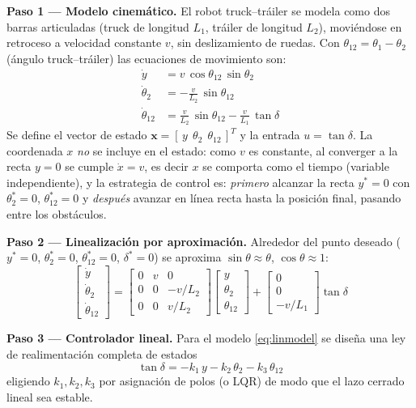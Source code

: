 \documentclass[11pt,a4paper]{article}
\begin{document}
\textbf{Paso 1 — Modelo cinemático.} El robot truck--tráiler se modela como dos barras articuladas (truck de longitud $L_1$, tráiler de longitud $L_2$), moviéndose en retroceso a velocidad constante $v$, sin deslizamiento de ruedas. Con $\theta_{12}=\theta_1-\theta_2$ (ángulo truck--tráiler) las ecuaciones de movimiento son:
\begin{align}
\dot{y} &= v\,\cos\theta_{12}\,\sin\theta_2 \\
\dot{\theta}_2 &= -\frac{v}{L_2}\,\sin\theta_{12} \\
\dot{\theta}_{12} &= \frac{v}{L_2}\,\sin\theta_{12} - \frac{v}{L_1}\,\tan\delta
\end{align}
Se define el vector de estado $\mathbf{x}=[\,y\ \ \theta_2\ \ \theta_{12}\,]^{T}$ y la entrada $u=\tan\delta$. La coordenada $x$ \emph{no} se incluye en el estado: como $v$ es constante, al converger a la recta $y=0$ se cumple $\dot x = v$, es decir $x$ se comporta como el tiempo (variable independiente), y la estrategia de control es: \emph{primero} alcanzar la recta $y^{*}=0$ con $\theta_2^{*}=0$, $\theta_{12}^{*}=0$ y \emph{después} avanzar en línea recta hasta la posición final, pasando entre los obstáculos.

\textbf{Paso 2 — Linealización por aproximación.} Alrededor del punto deseado ($y^{*}=0$, $\theta_2^{*}=0$, $\theta_{12}^{*}=0$, $\delta^{*}=0$) se aproxima $\sin\theta\approx\theta$, $\cos\theta\approx 1$:
\begin{equation}
\begin{bmatrix}\dot y\\ \dot\theta_2\\ \dot\theta_{12}\end{bmatrix}
=
\begin{bmatrix}0 & v & 0\\ 0 & 0 & -v/L_2\\ 0 & 0 & v/L_2\end{bmatrix}
\begin{bmatrix}y\\ \theta_2\\ \theta_{12}\end{bmatrix}
+
\begin{bmatrix}0\\ 0\\ -v/L_1\end{bmatrix}\tan\delta
\label{eq:linmodel}
\end{equation}

\textbf{Paso 3 — Controlador lineal.} Para el modelo \eqref{eq:linmodel} se diseña una ley de realimentación completa de estados
\begin{equation}
\tan\delta = -k_1\,y - k_2\,\theta_2 - k_3\,\theta_{12}
\label{eq:leylineal}
\end{equation}
eligiendo $k_1,k_2,k_3$ por asignación de polos (o LQR) de modo que el lazo cerrado lineal sea estable.
\end{document}
